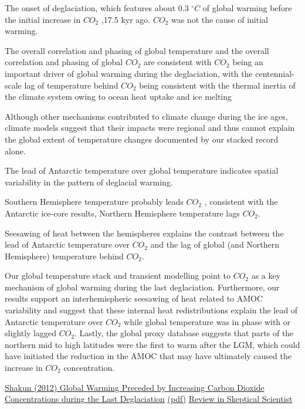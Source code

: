 \documentclass[
]{book}
\begin{document}
The onset of
deglaciation, which features about 0.3 \({}^\circ C\) of global warming before
the initial increase in \(CO_2\) ,17.5 kyr ago.
\(CO_2\) was not the cause of initial warming.

The overall correlation and phasing of global
temperature and the overall correlation and phasing of global
\(CO_2\) are consistent with \(CO_2\) being an important
driver of global warming during the deglaciation, with the centennial-
scale lag of temperature behind \(CO_2\) being consistent with the thermal
inertia of the climate system owing to ocean heat uptake and ice
melting

Although other mechanisms contributed to climate change during
the ice ages, climate models suggest that their impacts were regional
and thus cannot explain the global extent of temperature changes
documented by our stacked record alone.

The lead of Antarctic temperature over global temperature indicates
spatial variability in the pattern of deglacial warming.

Southern Hemisphere temperature probably leads \(CO_2\) ,
consistent with the Antarctic ice-core results,
Northern Hemisphere temperature lags \(CO_2\).

Seesawing of
heat between the hemispheres explains the contrast between the lead of
Antarctic temperature over \(CO_2\) and the lag of global (and Northern
Hemisphere) temperature behind \(CO_2\).

Our global temperature stack and transient modelling point to \(CO_2\)
as a key mechanism of global warming during the last deglaciation.
Furthermore, our results support an interhemispheric seesawing of
heat related to AMOC variability and suggest that these internal heat
redistributions explain the lead of Antarctic temperature over \(CO_2\)
while global temperature was in phase with or slightly lagged \(CO_2\).
Lastly, the global proxy database suggests that parts of the northern
mid to high latitudes were the first to warm after the LGM, which
could have initiated the reduction in the AMOC that may have
ultimately caused the increase in \(CO_2\) concentration.

\href{https://www.researchgate.net/publication/223987444_Global_Warming_Preceded_by_Increasing_Carbon_Dioxide_Concentrations_during_the_Last_Deglaciation}{Shakun (2012) Global Warming Preceded by Increasing Carbon Dioxide Concentrations during the Last Deglaciation}
\href{pdf/Shakun_2012_Warming_Preceded_by_CO2.pdf}{(pdf)}
\href{https://skepticalscience.com/skakun-co2-temp-lag.html}{Review in Skeptical Scientist}
\end{document}
